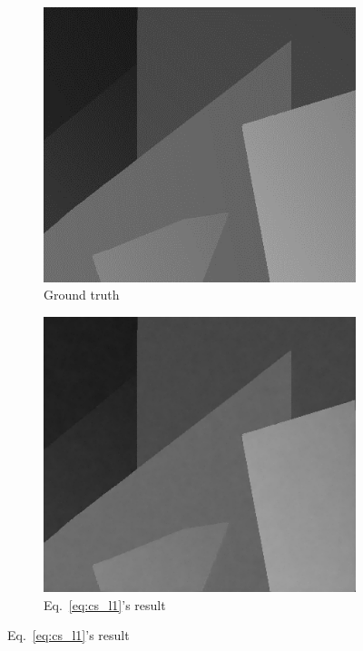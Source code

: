 \documentclass[preprint,10pt,5p,times,twocolumn]{elsarticle}
\begin{document}
\begin{figure}
\centering
\begin{subfigure}[b]{0.32\linewidth}
\includegraphics[width=\textwidth]{poster.png}
\caption{Ground truth}
\end{subfigure}
\begin{subfigure}[b]{0.32\linewidth}
\includegraphics[width=\textwidth]{poster_1.png}
\caption{Eq.~\eqref{eq:cs_l1}'s result}
\label{fig:cs_l1}

\end{subfigure}
\end{figure}
\end{document}
